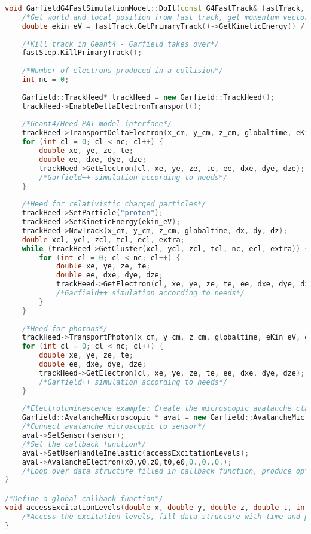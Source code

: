 \documentclass[preprint,12pt,sort&compress]{elsarticle}
\begin{document}
\newpage

\begin{lstlisting}[label=code_DoIt_Garfield, caption=G4FastSimulationModel DoIt() method for Garfield++., language=C++]
void GarfieldG4FastSimulationModel::DoIt(const G4FastTrack& fastTrack, G4FastStep& fastStep) {
	/*Get world and local position from fast track, get momentum vector from fast track, get global time in ns, and x,y,z position in cm, get kinetic energy of fast track in eV*/
	double ekin_eV = fastTrack.GetPrimaryTrack()->GetKineticEnergy() / eV;
	
	/*Kill track in Geant4 - Garfield takes over*/
	fastStep.KillPrimaryTrack();
	
	/*Number of electrons produced in a collision*/
	int nc = 0;
	
	Garfield::TrackHeed* trackHeed = new Garfield::TrackHeed();
	trackHeed->EnableDeltaElectronTransport();
	
	/*Geant4/Heed PAI model interface*/
	trackHeed->TransportDeltaElectron(x_cm, y_cm, z_cm, globaltime, eKin_eV, dx, dy, dz, nc);	
	for (int cl = 0; cl < nc; cl++) {
		double xe, ye, ze, te;
		double ee, dxe, dye, dze;
		trackHeed->GetElectron(cl, xe, ye, ze, te, ee, dxe, dye, dze);	
		/*Garfield++ simulation according to needs*/	
	} 
	
	/*Heed for relativistic charged particles*/
	trackHeed->SetParticle("proton");
	trackHeed->SetKineticEnergy(ekin_eV);
	trackHeed->NewTrack(x_cm, y_cm, z_cm, globaltime, dx, dy, dz);
	double xcl, ycl, zcl, tcl, ecl, extra;
	while (trackHeed->GetCluster(xcl, ycl, zcl, tcl, nc, ecl, extra)) {
		for (int cl = 0; cl < nc; cl++) {
			double xe, ye, ze, te;
			double ee, dxe, dye, dze;
			trackHeed->GetElectron(cl, xe, ye, ze, te, ee, dxe, dye, dze);	
			/*Garfield++ simulation according to needs*/	
		}
	} 
		
	/*Heed for photons*/
	trackHeed->TransportPhoton(x_cm, y_cm, z_cm, globaltime, eKin_eV, dx, dy, dz,	nc);	
	for (int cl = 0; cl < nc; cl++) {
		double xe, ye, ze, te;
		double ee, dxe, dye, dze;
		trackHeed->GetElectron(cl, xe, ye, ze, te, ee, dxe, dye, dze);	
		/*Garfield++ simulation according to needs*/		
	} 	
	
	/*Electroluminescence example: Create the microscopic avalanche class*/
	Garfield::AvalancheMicroscopic * aval = new Garfield::AvalancheMicroscopic();
	/*Connect avalanche microscopic to sensor*/ 	
	aval->SetSensor(sensor);
	/*Set the callback function*/
	aval->SetUserHandleInelastic(accessExcitationLevels);
	aval->AvalancheElectron(x0,y0,z0,t0,e0,0.,0.,0.);
	/*Loop over data structure filled in callback function, produce optical photons in Geant4
}

/*Define a global callback function*/
void accessExcitationLevels(double x, double y, double z, double t, int type, int level,Garfield::Medium * m) {
	/*Access the excitation levels, fill data structure with time and position of excitations*/
}
\end{lstlisting}
\end{document}
